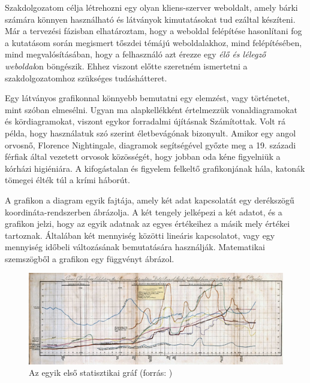 
Szakdolgozatom célja létrehozni egy olyan kliens-szerver weboldalt, amely bárki számára könnyen használható és látványok kimutatásokat tud ezáltal készíteni. Már a tervezési fázisban elhatároztam, hogy a weboldal felépítése hasonlítani fog a kutatásom során megismert tőszdei témájú weboldalakhoz, mind felépítésében, mind megvalósításában, hogy a felhasználó azt érezze egy\textit{ élő és lélegző weboldal}on böngészik. Ehhez viszont előtte szeretném ismertetni a szakdolgozatomhoz szükséges tudáshátteret.


Egy látványos grafikonnal könnyebb bemutatni egy elemzést, vagy történetet, mint szóban elmesélni. Ugyan ma alapkellékként értelmezzük vonaldiagramokat és kördiagramokat, viszont egykor forradalmi újításnak Számítottak. Volt rá példa, hogy használatuk szó szerint életbevágónak bizonyult. Amikor egy angol orvosnő, Florence Nightingale, diagramok segítségével győzte meg a 19. századi férfiak által vezetett orvosok közösségét, hogy jobban oda kéne figyelniük a kórházi higiéniára. A kifogástalan és figyelem felkeltő grafikonjának hála, katonák tömegei élték túl a krími háborút.  \cite{portfolio}

	A grafikon a diagram egyik fajtája, amely két adat kapcsolatát egy derékszögű koordináta-rendszerben ábrázolja. A két tengely jelképezi a két adatot, és a grafikon jelzi, hogy az egyik adatnak az egyes értékeihez a másik mely értékei tartoznak. Általában két mennyiség közötti lineáris kapcsolatot, vagy egy mennyiség időbeli változásának bemutatására használják. Matematikai szemszögből a grafikon egy függvényt ábrázol. \cite{wikiMatek}

\begin{figure}[h]
\centering
\includegraphics[scale=1]{images/historyOfGraphs}
\caption{Az egyik első statisztikai gráf (forrás: \cite{oldGraph})}
\end{figure}


